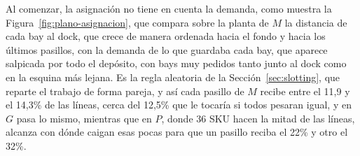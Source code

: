 Al comenzar, la asignación no tiene en cuenta la demanda, como muestra la Figura~\ref{fig:plano-asignacion}, que compara sobre la planta de $M$ la distancia de cada bay al dock, que crece de manera ordenada hacia el fondo y hacia los últimos pasillos, con la demanda de lo que guardaba cada bay, que aparece salpicada por todo el depósito, con bays muy pedidos tanto junto al dock como en la esquina más lejana.
Es la regla aleatoria de la Sección~\ref{sec:slotting}, que reparte el trabajo de forma pareja, y así cada pasillo de $M$ recibe entre el 11,9 y el 14,3\% de las líneas, cerca del 12,5\% que le tocaría si todos pesaran igual, y en $G$ pasa lo mismo, mientras que en $P$, donde 36 SKU hacen la mitad de las líneas, alcanza con dónde caigan esas pocas para que un pasillo reciba el 22\% y otro el 32\%.

